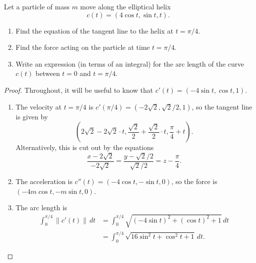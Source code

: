 \documentclass[openany]{book}
\begin{document}
\begin{prob}[34]
    Let a particle of mass \( m \) move along the elliptical helix  
    \[
    c(t) = (4 \cos t, \sin t, t).
    \]  

    \begin{enumerate}
        \item[(a)] Find the equation of the tangent line to the helix at \( t = \pi / 4 \).  
        \item[(b)] Find the force acting on the particle at time \( t = \pi / 4 \).  
        \item[(c)] Write an expression (in terms of an integral) for the arc length of the curve \( c(t) \) between \( t = 0 \) and \( t = \pi / 4 \).
    \end{enumerate}
\end{prob}
\begin{proof}
    Throughout, it will be useful to know that $c'(t)=(-4\sin t,\cos t,1)$.
    \begin{enumerate}
        \item[(a)] The velocity at $t=\pi/4$ is $c'(\pi/4)=(-2\sqrt2,\sqrt2/2,1)$, so the tangent line is given by
        \[\left(2\sqrt2-2\sqrt2\cdot t,\frac{\sqrt2}2+\frac{\sqrt2}2\cdot t,\frac\pi4+t\right).\]
        Alternatively, this is cut out by the equations
        \[\frac{x-2\sqrt2}{-2\sqrt2}=\frac{y-\sqrt2/2}{\sqrt2/2}=z-\frac\pi4.\]

        \item[(b)] The acceleration is $c''(t)=(-4\cos t,-\sin t,0)$, so the force is $(-4m\cos t,-m\sin t,0)$.

        \item[(c)] The arc length is
        \begin{align*}
            \int_0^{\pi/4}\lVert c'(t)\rVert \,dt &= \int_0^{\pi/4}\sqrt{\left(-4\sin t\right)^2+(\cos t)^2+1} \,dt \\
            &= \int_0^{\pi/4}\sqrt{16\sin^2 t+\cos^2 t+1} \,dt.
        \end{align*}
    \end{enumerate}
\end{proof}
\end{document}
